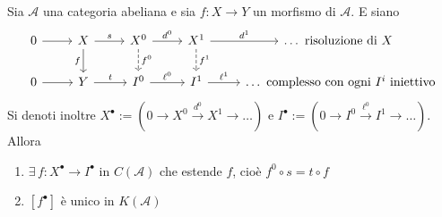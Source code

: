 \begin{proposition}{}\label{prop:non-so-niente}
    Sia \(\mathcal{A}\) una categoria abeliana e sia \(f : X \to Y\) un morfismo
    di \(\mathcal{A}\). E siano
    \[ \begin{tikzcd}
	0 & X & X^{0} & X^{1} & \dots \text{ risoluzione di \(X\) }\\
    0 & Y & I^{0} & I^{1} & \dots \text{ complesso con ogni \(I^{i}\) iniettivo}
	\arrow[from=1-1, to=1-2]
	\arrow["s", from=1-2, to=1-3]
	\arrow["f"', from=1-2, to=2-2]
	\arrow["d^{0}", from=1-3, to=1-4]
	\arrow["f^{0}", dashed, from=1-3, to=2-3]
	\arrow["d^{1}", from=1-4, to=1-5]
	\arrow["f^{1}", dashed, from=1-4, to=2-4]
	\arrow[from=2-1, to=2-2]
	\arrow["t",from=2-2, to=2-3]
	\arrow["\ell^{0}", from=2-3, to=2-4]
	\arrow["\ell^{1}", from=2-4, to=2-5]
\end{tikzcd} \]
    Si denoti inoltre \(X^\bullet := {\left( 0 \to X^{0} \overset{d^{0}}{\to}
    X^{1} \to \dots \right)} \) e \(I^\bullet := {\left( 0 \to I^{0}
\overset{\ell^{0}}{\to} I^{1} \to \dots \right)} \).
    Allora
\begin{enumerate}[label = \arabic*)]
    \item \(\exists \, f : X^\bullet \to I^\bullet\) in \(C{(\mathcal{A})}\) che
        estende \(f\), cioè \(f^0 \circ s = t \circ f\) 
    \item \([f^\bullet]\) è unico in \(K{(\mathcal{A})}\) 
\end{enumerate}
\end{proposition}
